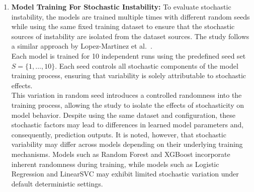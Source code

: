 \documentclass[12pt]{article}
\begin{document}
\begin{enumerate}
  A total of 100 bootstrap samples is generated from the original training dataset using sampling with replacement. This number is selected to ensure a stable estimation of prediction variability across runs while maintaining computational feasibility. Each bootstrapped dataset maintains the same size as the original training set but contains slight variations in data composition due to the resampling process. These variations simulate realistic perturbations in the data, such as missing or duplicated observations. To ensure that dataset sources of instability are isolated from the stochastic sources, a fixed random seed $ s = 0 $ is implemented for all dataset instability experiments.\\ 

  Each model is then be retrained independently on every bootstrapped sample with a fixed random seed of $ s = 0$. After training, predictions is generated using the fixed test dataset and stored in structured CSV files with the filename $<model>\_bs\_pred.csv$, where each column represents the predicted scores from a specific training run. This organized storage enables direct comparison of predictions across multiple runs for each individual.\\

  By repeating this process across all bootstrapped samples, the study produces a distribution of predictions for each test instance which serves as the basis for computing instability metrics in later stages of the methodology.

  \item \textbf{Model Training For Stochastic Instability:}
  To evaluate stochastic instability, the models are trained multiple times with different random seeds while using the same fixed training dataset to ensure that the stochastic sources of instability are isolated from the dataset sources. The study follows a similar approach by Lopez-Martinez et al.~\cite{lopez2022instability}.\\

  Each model is trained for 10 independent runs using the predefined seed set $S = \{1,\dots,10\}$. Each seed controls all stochastic components of the model training process, ensuring that variability is solely attributable to stochastic effects.\\

  This variation in random seed introduces a controlled randomness into the training process, allowing the study to isolate the effects of stochasticity on model behavior. Despite using the same dataset and configuration, these stochastic factors may lead to differences in learned model parameters and, consequently, prediction outputs. It is noted, however, that stochastic variability may differ across models depending on their underlying training mechanisms. Models such as Random Forest and XGBoost incorporate inherent randomness during training, while models such as Logistic Regression and LinearSVC may exhibit limited stochastic variation under default deterministic settings.\\


\end{enumerate}
\end{document}
